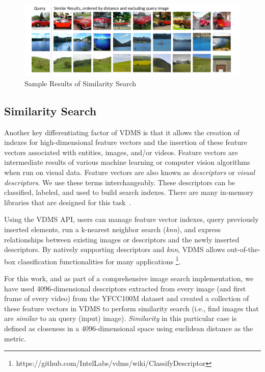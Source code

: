 
\begin{figure}[ht!]
\centering
\includegraphics[width=\textwidth]{figures/feature_img_results}
\caption{Sample Results of Similarity Search}
\label{fig:similarity}
\end{figure}

\subsection{Similarity Search}
\label{features}

Another key differentiating factor of VDMS is that it allows the creation of
indexes for high-dimensional feature vectors and the insertion of
these feature vectors associated with entities, images, and/or videos.
Feature vectors are intermediate results of various machine
learning or computer vision algorithms when run on visual data.
Feature vectors are also known as \textit{descriptors}
or \textit{visual descriptors}. We use these terms interchangeably.
These descriptors can be classified, labeled, and used to build search
indexes. There are many in-memory libraries that are designed for
this task~\cite{flann, faiss}.


Using the VDMS API, users can manage feature vector indexes,
query previously inserted elements,
run a k-nearest neighbor search (\textit{knn}), and express relationships
between existing images or descriptors and
the newly inserted descriptors.
By natively supporting descriptors and \textit{knn},
VDMS allows out-of-the-box classification functionalities for many applications
\footnote{https://github.com/IntelLabs/vdms/wiki/ClassifyDescriptor}.

For this work, and as part of a comprehensive image search implementation,
we have used 4096-dimensional descriptors extracted from every image
(and first frame of every video) from the YFCC100M dataset
and created a collection of these feature vectors in VDMS to
perform similarity search (i.e., find images that are
\textit{similar} to an query (input) image).
\textit{Similarity} in this particular case is defined as closeness
in a 4096-dimensional space using euclidean distance as the metric.

